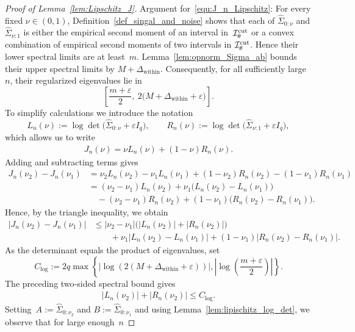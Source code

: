 \documentclass[10pt, letterpaper]{amsart}
\begin{document}
\begin{proof}[Proof of Lemma~\ref{lem:Lipschitz_J}]
Argument for~\eqref{equ:J_n_Lipschitz}: For every fixed
$\nu\in(0,1)$, Definition~\ref{def_singal_and_noise} shows that each of
$\widehat\Sigma_{0:\nu}$ and $\widehat\Sigma_{\nu:1}$ is either the empirical
second moment of an interval in~$\mathcal I_\theta^{\rm cut}$ or a convex
combination of empirical second moments of two intervals in
$\mathcal I_\theta^{\rm cut}$. Hence their lower spectral limits are at least~$m$.
Lemma~\ref{lem:opnorm_Sigma_ab} bounds their upper spectral limits by
$M+\Delta_{\mathrm{within}}$. Consequently, for all sufficiently large~$n$,
their regularized eigenvalues lie in
\[
\left[\frac{m+\varepsilon}{2},\
2\bigl(M+\Delta_{\mathrm{within}}+\varepsilon\bigr)\right].
\]
To simplify calculations we introduce the notation
\[
L_n(\nu):=\log\det\big(\widehat\Sigma_{0:\nu}+\varepsilon I_q\big),
\qquad
R_n(\nu):=\log\det\big(\widehat\Sigma_{\nu:1}+\varepsilon I_q\big),
\]
which allows us to write
\begin{align}
    J_n(\nu)=\nu L_n(\nu)+(1-\nu)R_n(\nu).
\end{align}
Adding and subtracting terms gives
\begin{align*}
J_n(\nu_2)-J_n(\nu_1)
&= \nu_2 L_n(\nu_2)-\nu_1 L_n(\nu_1) + (1-\nu_2)R_n(\nu_2)-(1-\nu_1)R_n(\nu_1)\\
&=(\nu_2-\nu_1)L_n(\nu_2)+\nu_1\big(L_n(\nu_2)-L_n(\nu_1)\big)\\
&\quad-(\nu_2-\nu_1)R_n(\nu_2)+(1-\nu_1)\big(R_n(\nu_2)-R_n(\nu_1)\big).
\end{align*}
Hence, by the triangle inequality, we obtain
\begin{align}\label{eq:Jn-split}
|J_n(\nu_2)-J_n(\nu_1)| & \leq |\nu_2-\nu_1|\big(|L_n(\nu_2)|+|R_n(\nu_2)|\big) \\
  & \qquad + \nu_1|L_n(\nu_2)-L_n(\nu_1)| + (1-\nu_1)|R_n(\nu_2)-R_n(\nu_1)|.
\end{align}
As the determinant equals the product of eigenvalues, set
\[
C_{\log}:=
2q\max\left\{
\left|\log\!\left(2(M+\Delta_{\mathrm{within}}+\varepsilon)\right)\right|,
\left|\log\!\left(\frac{m+\varepsilon}{2}\right)\right|
\right\}.
\]
The preceding two-sided spectral bound gives
\begin{align}\label{equ:bound_1}
|L_n(\nu_2)|+|R_n(\nu_2)|\leq C_{\log}.
\end{align}
Setting~$A:=\widehat\Sigma_{0:\nu_2}$ and
$B:=\widehat\Sigma_{0:\nu_1}$ and using Lemma~\ref{lem:lipischitz_log_det}, we observe that for large enough~$n$

\end{proof}
\end{document}
